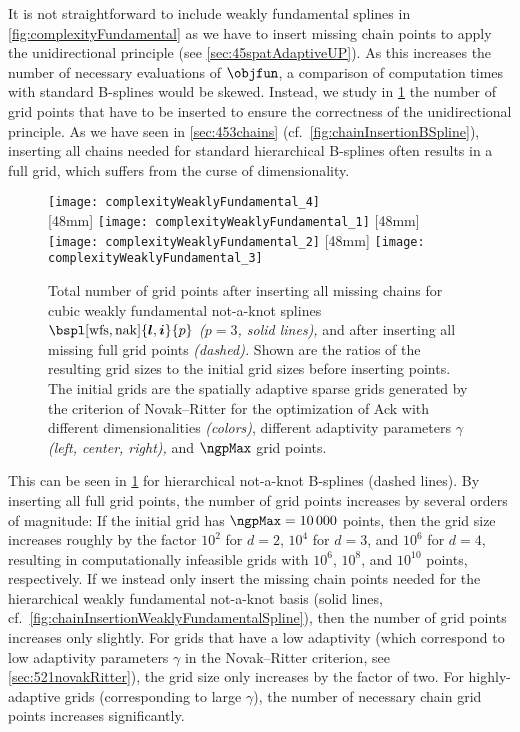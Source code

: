 It is not straightforward to include weakly fundamental splines
in \cref{fig:complexityFundamental} as we have to insert missing
chain points to apply the unidirectional principle
(see \cref{sec:45spatAdaptiveUP}).
As this increases the number of necessary evaluations of $\objfun$,
a comparison of computation times with standard B-splines would be skewed.
Instead, we study in \cref{fig:complexityWeaklyFundamental}
the number of grid points that have to be inserted
to ensure the correctness of the unidirectional principle.
As we have seen in \cref{sec:453chains}
(cf.\ \cref{fig:chainInsertionBSpline}),
inserting all chains needed for standard hierarchical B-splines
often results in a full grid, which suffers from the curse of dimensionality.
%
\begin{figure}
  \texttt{[image: complexityWeaklyFundamental\_4]}\\[2mm]%
  [48mm]{%
    \texttt{[image: complexityWeaklyFundamental\_1]}%
  }%
  \hfill%
  [48mm]{%
    \texttt{[image: complexityWeaklyFundamental\_2]}%
  }%
  \hfill%
  [48mm]{%
    \texttt{[image: complexityWeaklyFundamental\_3]}%
  }%
  \caption[Complexity of weakly fundamental splines]{%
    Total number of grid points after inserting all missing chains
    for cubic weakly fundamental not-a-knot splines
    $\bspl[\wfs,\nak]{\*l,\*i}{p}$ \emph{($p = 3$, solid lines),}
    and after inserting all missing full grid points \emph{(dashed).}
    Shown are the ratios of the resulting grid sizes to the
    initial grid sizes before inserting points.
    The initial grids are the spatially adaptive sparse grids generated
    by the criterion of Novak--Ritter for the optimization of Ack with
    different dimensionalities \emph{(colors)},
    different adaptivity parameters $\gamma$ \emph{(left, center, right),}
    and $\ngpMax$ grid points.%
  }%
  \label{fig:complexityWeaklyFundamental}%
\end{figure}%
%
This can be seen in \cref{fig:complexityWeaklyFundamental}
for hierarchical not-a-knot B-splines (dashed lines).
By inserting all full grid points,
the number of grid points increases by several orders of magnitude:
If the initial grid has $\ngpMax = \num{10000}$ points,
then the grid size increases roughly by the factor $10^2$ for $d = 2$,
$10^4$ for $d = 3$, and $10^6$ for $d = 4$,
resulting in computationally infeasible
grids with $10^6$, $10^8$, and $10^{10}$ points, respectively.
If we instead only insert the missing chain points needed for the
hierarchical weakly fundamental not-a-knot basis
(solid lines, cf.\ \cref{fig:chainInsertionWeaklyFundamentalSpline}),
then the number of grid points increases only slightly.
For grids that have a low adaptivity (which correspond
to low adaptivity parameters $\gamma$ in the Novak--Ritter criterion,
see \cref{sec:521novakRitter}), the grid size only increases by the
factor of two.
For highly-adaptive grids
(corresponding to large $\gamma$),
the number of necessary chain grid points increases significantly.



